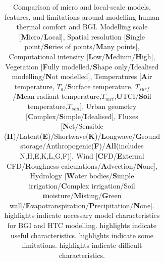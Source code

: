 \begin{table}
\begin{tabular}{c c c c c c c c c c c}
\end{tabular}
\caption{\label{tab:modelcompare}Comparison of micro and local-scale models, features, and limitations around modelling human thermal comfort and BGI. Modelling scale [\textbf{M}icro/\textbf{L}ocal], Spatial resolution [\textbf{S}ingle point/\textbf{Se}ries of points/\textbf{M}any points], Computational intensity [\textbf{L}ow/\textbf{M}edium/\textbf{H}igh], Vegetation [\textbf{F}ully modelled/\textbf{S}hape only/\textbf{I}dealised modelling/\textbf{N}ot modelled], Temperatures [\textbf{A}ir temperature, $T_{a}$/\textbf{S}urface temperature, $T_{surf}$/\textbf{M}ean radiant temperature,$T_{mrt}$,\textbf{U}TCI/\textbf{So}il temperature,$T_{soil}$], Urban geometry [\textbf{C}omplex/\textbf{S}imple/\textbf{I}dealised], Fluxes [\textbf{N}et/Sensible (\textbf{H})/Latent(\textbf{E})/Shortwave(\textbf{K})/\textbf{L}ongwave/\textbf{G}round storage/Anthropogenic(\textbf{F})/\textbf{All}(includes N,H,E,K,L,G,F)], Wind [\textbf{C}FD/\textbf{E}xternal CFD/\textbf{R}oughness calculations/\textbf{A}dvection/\textbf{N}one], Hydrology [\textbf{W}ater bodies/\textbf{S}imple irrigation/\textbf{C}omplex irrigation/Soil \textbf{m}oisture/\textbf{M}isting/\textbf{G}reen wall/\textbf{E}vapotranspiration/\textbf{P}recipitation/\textbf{N}one].  highlights indicate necessary model characteristics for BGI and HTC modelling.  highlights indicate useful characteristics.  highlights indicate some limitations.  highlights indicate difficult characteristics.}
\end{table}

